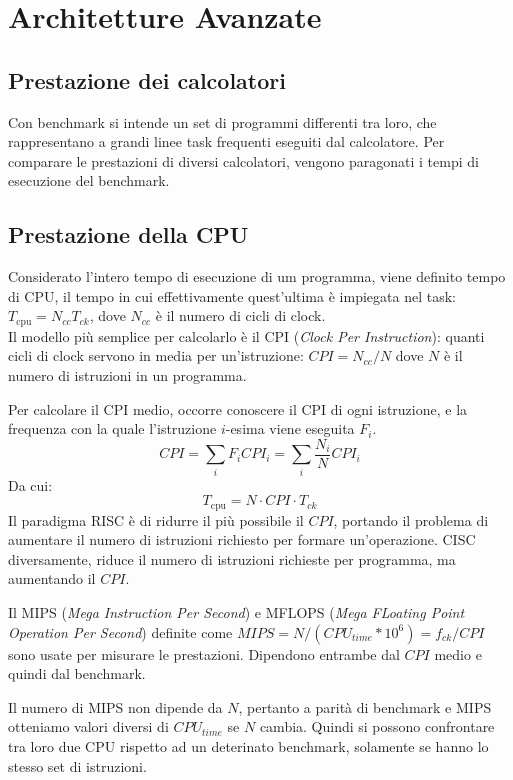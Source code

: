 \documentclass[../template]{subfiles}
\begin{document}
\section{Architetture Avanzate}
\subsection{Prestazione dei calcolatori}
Con benchmark si intende un set di programmi differenti tra loro, che rappresentano
a grandi linee task frequenti eseguiti dal calcolatore.
Per comparare le prestazioni di diversi calcolatori, vengono paragonati
i tempi di esecuzione del benchmark.

\def\tcpu{T_\text{cpu}}

\subsection{Prestazione della CPU}
Considerato l'intero tempo di esecuzione di um programma, viene definito tempo di CPU, il tempo in cui effettivamente
quest'ultima è impiegata nel task: $\tcpu = N_{cc} T_{ck}$, dove $N_{cc}$ è il numero di cicli di clock.
\\
Il modello più semplice per calcolarlo è il CPI (\textit{Clock Per Instruction}): quanti cicli di clock servono in media
per un'istruzione: $\mathit{CPI} = N_{cc}/N$ dove $N$ è il numero di istruzioni in un programma.

Per calcolare il CPI medio, occorre conoscere il CPI di ogni istruzione, e la frequenza con la quale l'istruzione
$i$-esima viene eseguita $F_i$.
\[
    \mathit{CPI} = \sum_i F_i \mathit{CPI}_i = \sum_i \frac{N_i}{N} \mathit{CPI}_i
\]
Da cui:
\[
    \tcpu = N \cdot \mathit{CPI} \cdot T_{ck}
\]
Il paradigma RISC è di ridurre il più possibile il $\mathit{CPI}$, portando il problema di aumentare il numero di
istruzioni richiesto per formare un'operazione. CISC diversamente, riduce il numero di istruzioni richieste per
programma, ma aumentando il $\mathit{CPI}$.

Il MIPS (\textit{Mega Instruction Per Second}) e MFLOPS (\textit{Mega FLoating Point Operation Per Second}) definite come
$\mathit{MIPS} = N / (\mathit{CPU}_\mathit{time} * 10^6) = f_\mathit{ck} / \mathit{CPI}$ sono usate per misurare le prestazioni.
Dipendono entrambe dal $\mathit{CPI}$ medio e quindi dal benchmark.

Il numero di MIPS non dipende da $N$, pertanto a parità di benchmark e MIPS otteniamo valori diversi di
$\mathit{CPU}_\mathit{time}$ se $N$ cambia. Quindi si possono confrontare tra loro due CPU rispetto ad un deterinato
benchmark, solamente se hanno lo stesso set di istruzioni.
\end{document}
